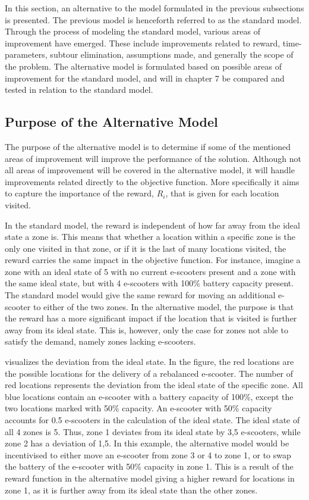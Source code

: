 In this section, an alternative to the model formulated in the previous subsections is presented. The previous model is henceforth referred to as the standard model. Through the process of modeling the standard model, various areas of improvement have emerged. These include improvements related to reward, time-parameters, subtour elimination, assumptions made, and generally the scope of the problem. The alternative model is formulated based on possible areas of improvement for the standard model, and will in chapter 7 be compared and tested in relation to the standard model. 

\subsection{Purpose of the Alternative Model}

The purpose of the alternative model is to determine if some of the mentioned areas of improvement will improve the performance of the solution. Although not all areas of improvement will be covered in the alternative model, it will handle improvements related directly to the objective function. More specifically it aims to capture the importance of the reward, $R_{i}$, that is given for each location visited. 

In the standard model, the reward is independent of how far away from the ideal state a zone is. This means that whether a location within a specific zone is the only one visited in that zone, or if it is the last of many locations visited, the reward carries the same impact in the objective function. For instance, imagine a zone with an ideal state of 5 with no current e-scooters present and a zone with the same ideal state, but with 4 e-scooters with 100\% battery capacity present. The standard model would give the same reward for moving an additional e-scooter to either of the two zones. In the alternative model, the purpose is that the reward has a more significant impact if the location that is visited is further away from its ideal state. This is, however, only the case for zones not able to satisfy the demand, namely zones lacking e-scooters. 

 visualizes the deviation from the ideal state. In the figure, the red locations are the possible locations for the delivery of a rebalanced e-scooter. The number of red locations represents the deviation from the ideal state of the specific zone. All blue locations contain an e-scooter with a battery capacity of 100\%, except the two locations marked with 50\% capacity. An e-scooter with 50\% capacity accounts for 0.5 e-scooters in the calculation of the ideal state. The ideal state of all 4 zones is 5. Thus, zone 1 deviates from its ideal state by 3,5 e-scooters, while zone 2 has a deviation of 1,5. In this example, the alternative model would be incentivised to either move an e-scooter from zone 3 or 4 to zone 1, or to swap the battery of the e-scooter with 50\% capacity in zone 1. This is a result of the reward function in the alternative model giving a higher reward for locations in zone 1, as it is further away from its ideal state than the other zones. 
\\

